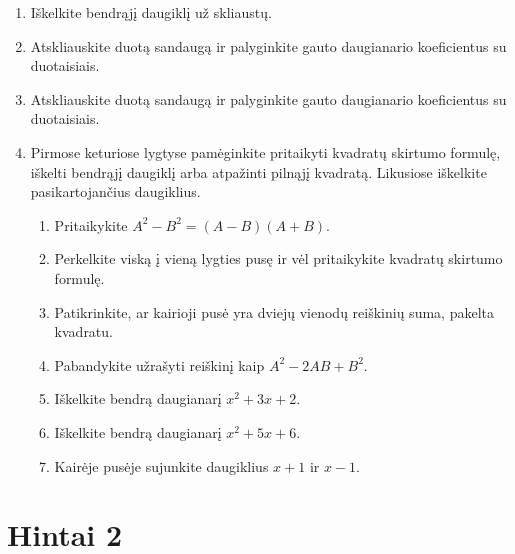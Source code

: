 \documentclass[11pt,a4paper]{scrartcl}
\begin{document}
\begin{enumerate}[label=\textbf{\arabic*.}, leftmargin=*]
    \item Iškelkite bendrąjį daugiklį už skliaustų.
    \item Atskliauskite duotą sandaugą ir palyginkite gauto daugianario koeficientus su duotaisiais.
    \item Atskliauskite duotą sandaugą ir palyginkite gauto daugianario koeficientus su duotaisiais.
    \item Pirmose keturiose lygtyse pamėginkite pritaikyti kvadratų skirtumo formulę, iškelti bendrąjį daugiklį arba atpažinti pilnąjį kvadratą. Likusiose iškelkite pasikartojančius daugiklius.
    \begin{enumerate}[label={(\arabic*)}]
        \item Pritaikykite $A^2-B^2=(A-B)(A+B)$.
        \item Perkelkite viską į vieną lygties pusę ir vėl pritaikykite kvadratų skirtumo formulę.
        \item Patikrinkite, ar kairioji pusė yra dviejų vienodų reiškinių suma, pakelta kvadratu.
        \item Pabandykite užrašyti reiškinį kaip $A^2-2AB+B^2$.
        \item Iškelkite bendrą daugianarį $x^2+3x+2$.
        \item Iškelkite bendrą daugianarį $x^2+5x+6$.
        \item Kairėje pusėje sujunkite daugiklius $x+1$ ir $x-1$.
    \end{enumerate}
\end{enumerate}

\newpage
\section{Hintai 2}
\end{document}
